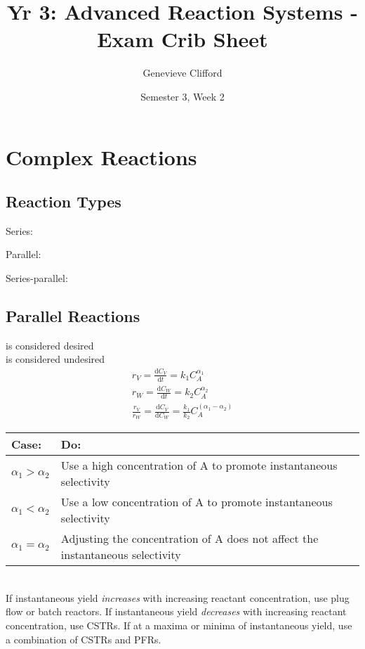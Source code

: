 \documentclass[10pt, oneside, twocolumn]{article}
\title{Yr 3: Advanced Reaction Systems - Exam Crib Sheet}
\author{Genevieve Clifford}
\date{Semester 3, Week 2}
\numberwithin{equation}{section}
\begin{document}
	\maketitle
	\section{Complex Reactions}
		\subsection{Reaction Types}
			Series:\par
			 \par
			Parallel:\par
			 \par
			 \par
			Series-parallel:\par
			 \par
			 \par
		\subsection{Parallel Reactions}
			 is considered desired\\
			 is considered undesired\\
			\begin{gather}
				r_V=\frac{\mathrm{d}C_V}{\mathrm{d}t}=k_1C_A^{\alpha_1}\\
				r_W=\frac{\mathrm{d}C_W}{\mathrm{d}t}=k_2C_A^{\alpha_2}\\
				\frac{r_V}{r_W}=\frac{\mathrm{d}C_V}{\mathrm{d}C_W}=\frac{k_1}{k_2}C_A^{(\alpha_1-\alpha_2)}
			\end{gather}
			\begin{table}[h!]
				\begin{tabular}{l|p{}}
				Case:	&  Do:\\
				\hline
				$\alpha_1>\alpha_2$	&Use a high concentration of A to promote instantaneous selectivity  \\
				$\alpha_1<\alpha_2$	&Use a low concentration of A to promote instantaneous selectivity  \\
				$\alpha_1=\alpha_2$	&Adjusting the concentration of A does not affect the instantaneous selectivity  \\ 
				\end{tabular}
			\end{table}\\
			If instantaneous yield \textit{increases} with increasing reactant concentration, use plug flow or batch reactors. If instantaneous yield \textit{decreases} with increasing reactant concentration, use CSTRs. If at a maxima or minima of instantaneous yield, use a combination of CSTRs and PFRs.
\end{document}
